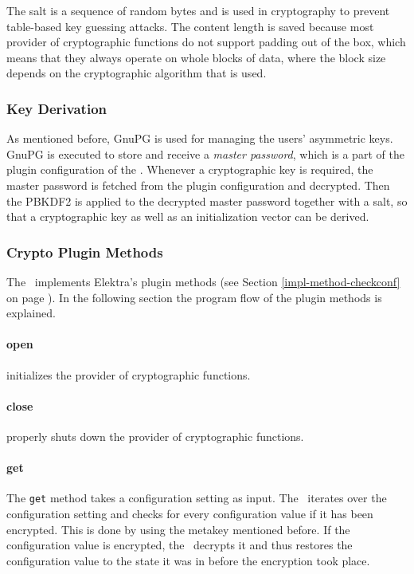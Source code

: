The salt is a sequence of random bytes and is used in cryptography to prevent table-based key guessing attacks.
The content length is saved because most provider of cryptographic functions do not support padding out of the box, which means that they always operate on whole blocks of data, where the block size depends on the cryptographic algorithm that is used.

\subsubsection{Key Derivation}

As mentioned before, GnuPG is used for managing the users' asymmetric keys.
GnuPG is executed to store and receive a \emph{master password}, which is a part of the plugin configuration of the \crypto.
Whenever a cryptographic key is required, the master password is fetched from the plugin configuration and decrypted.
Then the PBKDF2 is applied to the decrypted master password together with a salt, so that a cryptographic key as well as an initialization vector can be derived.

\subsubsection{Crypto Plugin Methods}

The \crypto ~implements Elektra's plugin methods (see Section \ref{impl-method-checkconf} on page \pageref{impl-method-checkconf}).
In the following section the program flow of the plugin methods is explained.

\paragraph*{open}
initializes the provider of cryptographic functions.

\paragraph*{close}
properly shuts down the provider of cryptographic functions.

\paragraph*{get}
The \texttt{get} method takes a configuration setting as input.
The \crypto ~iterates over the configuration setting and checks for every configuration value if it has been encrypted.
This is done by using the metakey mentioned before.
If the configuration value is encrypted, the \crypto ~decrypts it and thus restores the configuration value to the state it was in before the encryption took place.


